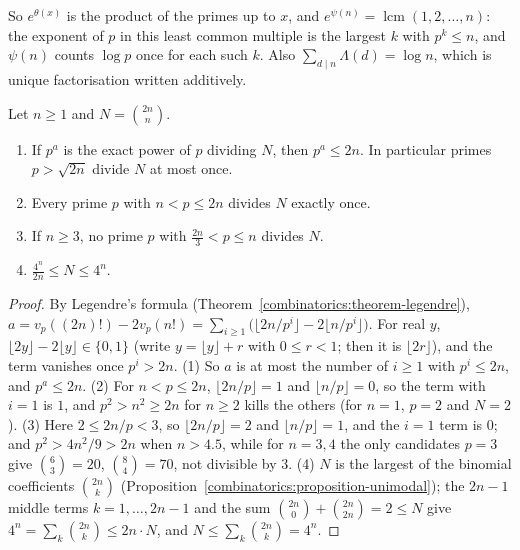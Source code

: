 So $e^{\theta(x)}$ is the product of the primes up to $x$, and $e^{\psi(n)} = \operatorname{lcm}(1, 2, \ldots, n)$: the exponent of $p$ in this least common multiple is the largest $k$ with
$p^k \leq n$, and $\psi(n)$ counts $\log p$ once for each such $k$. Also $\sum_{d \mid n}\Lambda(d) = \log n$, which is unique factorisation written additively.

\begin{lemma}\label{prime-numbers:lemma-central-binomial-primes}
Let $n \geq 1$ and $N = \binom{2n}{n}$.
\begin{enumerate}
\item If $p^a$ is the exact power of $p$ dividing $N$, then $p^a \leq 2n$. In particular primes $p > \sqrt{2n}$ divide $N$ at most once.
\item Every prime $p$ with $n < p \leq 2n$ divides $N$ exactly once.
\item If $n \geq 3$, no prime $p$ with $\frac{2n}{3} < p \leq n$ divides $N$.
\item $\frac{4^n}{2n} \leq N \leq 4^n$.
\end{enumerate}
\end{lemma}

\begin{proof}
By Legendre's formula (Theorem~\ref{combinatorics:theorem-legendre}), $a = v_p((2n)!) - 2v_p(n!) = \sum_{i \geq 1}\bigl(\lfloor 2n/p^i\rfloor - 2\lfloor n/p^i\rfloor\bigr)$. For real $y$,
$\lfloor 2y\rfloor - 2\lfloor y\rfloor \in \{0, 1\}$ (write $y = \lfloor y\rfloor + r$ with $0 \leq r < 1$; then it is $\lfloor 2r\rfloor$), and the term vanishes once $p^i > 2n$.
(1) So $a$ is at most the number of $i \geq 1$ with $p^i \leq 2n$, and $p^a \leq 2n$. (2) For $n < p \leq 2n$, $\lfloor 2n/p\rfloor = 1$ and $\lfloor n/p\rfloor = 0$, so the term with $i = 1$ is $1$, and $p^2 > n^2 \geq 2n$ for $n \geq 2$ kills the others (for $n = 1$, $p = 2$ and $N = 2$). (3) Here $2 \leq 2n/p < 3$, so $\lfloor 2n/p\rfloor = 2$ and
$\lfloor n/p\rfloor = 1$, and the $i = 1$ term is $0$; and $p^2 > 4n^2/9 > 2n$ when $n > 4.5$, while for $n = 3, 4$ the only candidates $p = 3$ give $\binom{6}{3} = 20$, $\binom{8}{4} = 70$,
not divisible by $3$. (4) $N$ is the largest of the binomial coefficients $\binom{2n}{k}$ (Proposition~\ref{combinatorics:proposition-unimodal}); the $2n - 1$ middle terms $k = 1, \ldots, 2n - 1$
and the sum $\binom{2n}{0} + \binom{2n}{2n} = 2 \leq N$ give $4^n = \sum_k\binom{2n}{k} \leq 2n \cdot N$, and $N \leq \sum_k\binom{2n}{k} = 4^n$.
\end{proof}

